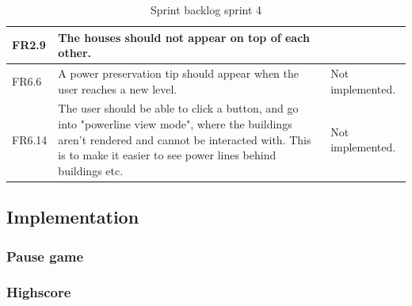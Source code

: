 \begin{table}
\begin{tabular}{| p{1.2cm} | p{8cm} | p{3cm} |}
		FR2.9 & The houses should not appear on top of each other. & \\ \hline
		
		FR6.6 & A power preservation tip should appear when the user reaches a new level. & Not implemented. \\ \hline

		FR6.14 & The user should be able to click a button, and go into "powerline view mode", where the buildings aren't rendered and cannot be interacted with. This is to make it easier to see power lines behind buildings etc. & Not implemented. \\ \hline
	\end{tabular}
	\caption{Sprint backlog sprint 4}
	\end{table}

\subsection{Implementation}

	\subsubsection*{Pause game}

	\subsubsection*{Highscore}
	

